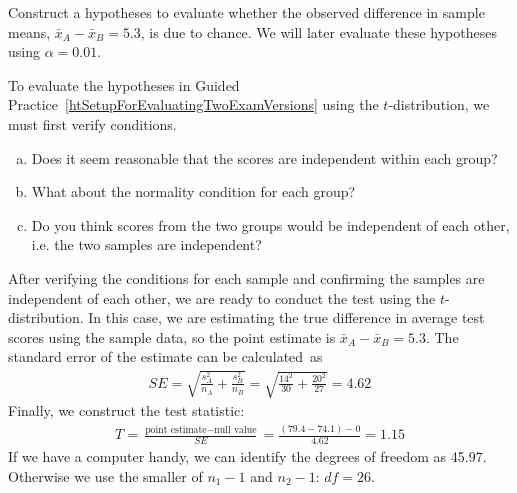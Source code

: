 \begin{exercisewrap}
\begin{nexercise}
\label{htSetupForEvaluatingTwoExamVersions}%
Construct a hypotheses to evaluate whether the observed
difference in sample means, $\bar{x}_A - \bar{x}_B=5.3$,
is due to chance. We will later evaluate these hypotheses
using $\alpha = 0.01$.\footnotemark{}
\end{nexercise}
\end{exercisewrap}

\begin{exercisewrap}
\begin{nexercise} \label{conditionsForTDistForEvaluatingTwoExamVersions}%
To evaluate the hypotheses in Guided Practice~\ref{htSetupForEvaluatingTwoExamVersions} using the $t$-distribution, we must first verify conditions.\footnotemark{}
\begin{enumerate}[(a)]
\setlength{\itemsep}{0mm}
\item
    Does it seem reasonable that the scores are independent
    within each group?
\item
    What about the normality condition for each group?
\item
    Do you think scores from the two groups would be independent
    of each other, i.e. the two samples are
    independent?
\end{enumerate}
\end{nexercise}
\end{exercisewrap}

After verifying the conditions for each sample and confirming the samples are independent of each other, we are ready to conduct the test using the $t$-distribution. In this case, we are estimating the true difference in average test scores using the sample data, so the point estimate is $\bar{x}_A - \bar{x}_B = 5.3$. The standard error of the estimate can be calculated~as
\begin{align*}
SE
  = \sqrt{\frac{s_A^2}{n_A} + \frac{s_B^2}{n_B}}
  = \sqrt{\frac{14^2}{30} + \frac{20^2}{27}}
  = 4.62
\end{align*}
Finally, we construct the test statistic:
\begin{align*}
T
  = \frac{\text{point estimate} - \text{null value}}{SE}
  = \frac{(79.4-74.1) - 0}{4.62}
  = 1.15
\end{align*}
If we have a computer handy, we can identify the degrees
of freedom as 45.97.
Otherwise we use the smaller of $n_1-1$ and $n_2-1$: $df=26$. 

